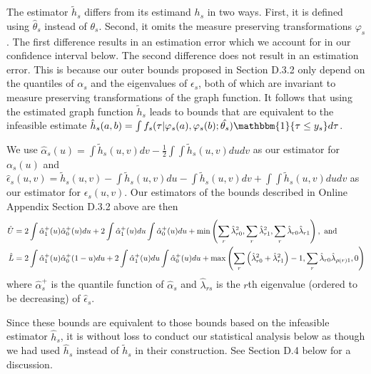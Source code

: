 \documentclass[12pt]{article}
\theoremstyle{definition}
\begin{document}
{The estimator $\tilde{h}_s$ differs from its estimand $h_s$ in two ways. First, it is defined using $\hat{\theta}_s$ instead of $\theta_s$. Second, it omits the measure preserving transformations $\varphi_s$. The first difference results in an estimation error which we account for in our confidence interval below. The second difference does not result in an estimation error. This is because our outer bounds proposed in Section D.3.2 only depend on the quantiles of $\alpha_s$ and the eigenvalues of $\epsilon_s$, both of which are invariant to measure preserving transformations of the graph function. It follows that using the estimated graph function $\tilde{h}_s$ leads to bounds that are equivalent to the infeasible estimate $\hat{h}_s(a,b) = \int f_{s}(\tau | \varphi_s(a),\varphi_s(b);\hat{\theta_s})\mathbbm{1}\{\tau \leq y_s\}d\tau$.    

We use $\hat{\alpha}_s(u) =  \int \tilde{h}_s(u,v)dv - \frac{1}{2} \int\int \tilde{h}_s(u,v) dudv$ as our estimator for $\alpha_{s}(u)$ and $\hat{\epsilon}_{s}(u,v) = \tilde{h}_s(u,v)  - \int \tilde{h}_s(u,v) du - \int \tilde{h}_s(u,v) dv + \int \int \tilde{h}_s(u,v) dudv$ as our estimator for $\epsilon_{s}(u,v)$. Our estimators of the bounds described in Online Appendix Section D.3.2 above are then  
\begin{align*}
\hat{U} &= 2\int\hat{\alpha}_{1}^{+}(u)\hat{\alpha}_{0}^{+}(u)du + 2\int\hat{\alpha}_{1}^{+}(u)du\int\hat{\alpha}_{0}^{+}(u)du + \min\left(\sum_{r}\hat{\lambda}_{r0}^{2}, \sum_{r}\hat{\lambda}_{r1}^{2}, \sum_{r}\hat{\lambda}_{r0}\hat{\lambda}_{r1}\right), \text{ and }\\
\hat{L} &= 2\int\hat{\alpha}_{1}^{+}(u)\hat{\alpha}_{0}^{+}(1-u)du + 2\int\hat{\alpha}_{1}^{+}(u)du\int\hat{\alpha}_{0}^{+}(u)du + \max\left(\sum_{r}\left(\hat{\lambda}_{r0}^{2} + \hat{\lambda}_{r1}^{2}\right) - 1, \sum_{r}\hat{\lambda}_{r0}\hat{\lambda}_{\rho(r)1},0\right)  \looseness=-1 
\end{align*}
where $\hat{\alpha}^{+}_s$ is the quantile function of $\hat{\alpha}_s$ and $\hat{\lambda}_{rs}$ is the $r$th eigenvalue  (ordered to be decreasing) of $\hat{\epsilon}_s$.   

Since these bounds are equivalent to those bounds based on the infeasible estimator $\hat{h}_s$, it is without loss to conduct our statistical analysis below as though we had used $\hat{h}_s$ instead of $\tilde{h}_s$ in their construction. See Section D.4 below for a discussion.   


}
\end{document}
